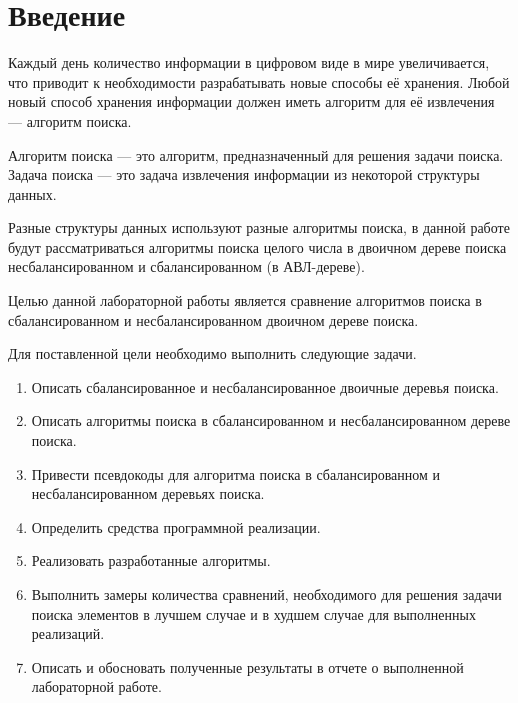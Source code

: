 \chapter*{Введение}

Каждый день количество информации в цифровом виде в мире увеличивается, что приводит к необходимости разрабатывать новые способы её хранения.
Любой новый способ хранения информации должен иметь алгоритм для её извлечения --- алгоритм поиска.

Алгоритм поиска --- это алгоритм, предназначенный для решения задачи поиска.
Задача поиска --- это задача извлечения информации из некоторой структуры данных.

Разные структуры данных используют разные алгоритмы поиска, в данной работе будут рассматриваться алгоритмы поиска целого числа в двоичном дереве поиска несбалансированном и сбалансированном (в АВЛ-дереве).

Целью данной лабораторной работы является сравнение алгоритмов поиска в сбалансированном и несбалансированном двоичном дереве поиска.

Для поставленной цели необходимо выполнить следующие задачи.
\begin{enumerate}
	\item Описать сбалансированное и несбалансированное двоичные деревья поиска.
	\item Описать алгоритмы поиска в сбалансированном и несбалансированном дереве поиска.
	\item Привести псевдокоды для алгоритма поиска в сбалансированном и несбалансированном деревьях поиска.
	\item Определить средства программной реализации.
	\item Реализовать разработанные алгоритмы.
	\item Выполнить замеры количества сравнений, необходимого для решения задачи поиска элементов в лучшем случае и в худшем случае для выполненных реализаций.
	\item Описать и обосновать полученные результаты в отчете о выполненной лабораторной работе.
\end{enumerate}
